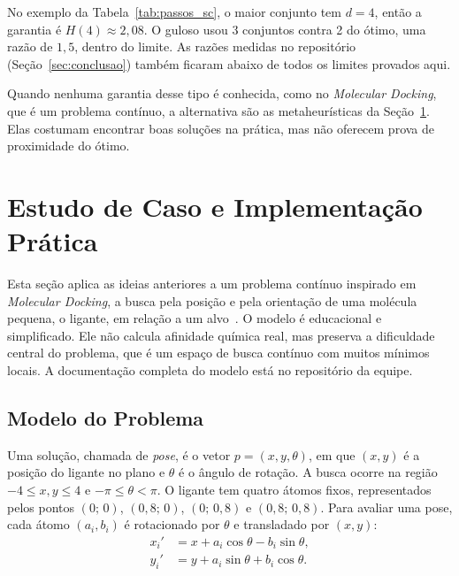 \documentclass[conference]{IEEEtran}
\theoremstyle{definition}
\theoremstyle{plain}
\begin{document}
No exemplo da Tabela~\ref{tab:passos_sc}, o maior conjunto tem $d = 4$, então a garantia é $H(4) \approx 2{,}08$. O guloso usou 3 conjuntos contra 2 do ótimo, uma razão de $1{,}5$, dentro do limite. As razões medidas no repositório (Seção~\ref{sec:conclusao}) também ficaram abaixo de todos os limites provados aqui.

Quando nenhuma garantia desse tipo é conhecida, como no \textit{Molecular Docking}, que é um problema contínuo, a alternativa são as metaheurísticas da Seção~\ref{sec:estudo_de_caso}. Elas costumam encontrar boas soluções na prática, mas não oferecem prova de proximidade do ótimo.

\section{Estudo de Caso e Implementação Prática}
\label{sec:estudo_de_caso}


Esta seção aplica as ideias anteriores a um problema contínuo inspirado em \textit{Molecular Docking}, a busca pela posição e pela orientação de uma molécula pequena, o ligante, em relação a um alvo~\cite{pagadala2017software}. O modelo é educacional e simplificado. Ele não calcula afinidade química real, mas preserva a dificuldade central do problema, que é um espaço de busca contínuo com muitos mínimos locais. A documentação completa do modelo está no repositório da equipe.

\subsection{Modelo do Problema}
\label{subsec:modelo}

Uma solução, chamada de \textit{pose}, é o vetor $p = (x, y, \theta)$, em que $(x, y)$ é a posição do ligante no plano e $\theta$ é o ângulo de rotação. A busca ocorre na região $-4 \le x, y \le 4$ e $-\pi \le \theta < \pi$. O ligante tem quatro átomos fixos, representados pelos pontos $(0;\,0)$, $(0{,}8;\,0)$, $(0;\,0{,}8)$ e $(0{,}8;\,0{,}8)$. Para avaliar uma pose, cada átomo $(a_i, b_i)$ é rotacionado por $\theta$ e transladado por $(x, y)$:
\begin{equation}
\begin{aligned}
x_i' &= x + a_i \cos\theta - b_i \sin\theta,\\
y_i' &= y + a_i \sin\theta + b_i \cos\theta.
\end{aligned}
\end{equation}
\end{document}
